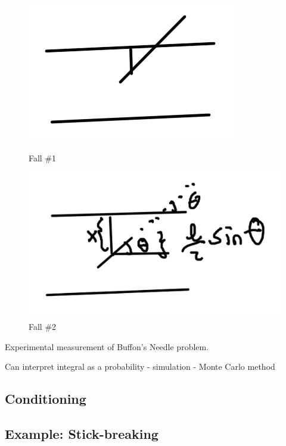 \begin{figure}[h]
\centering
\begin{minipage}{.45\linewidth}
  \includegraphics[width=\linewidth]{images/L09/buffon1.jpeg}
  \caption{Fall \#1}
  \label{bufffon1}
\end{minipage}
\hspace{.05\linewidth}
\begin{minipage}{.45\linewidth}
  \includegraphics[width=\linewidth]{images/L09/buffon2.jpeg}
  \caption{Fall \#2}
  \label{bufffon2}
\end{minipage}
\end{figure}



Experimental measurement of Buffon's Needle problem.


Can interpret integral as a probability - simulation - Monte Carlo method

\subsection{Conditioning}


\subsection{Example: Stick-breaking}

